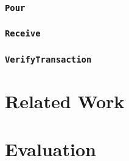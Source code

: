\documentclass{article}
\begin{document}
\subsubsection{\texttt{Pour}}
\subsubsection{\texttt{Receive}}
\subsubsection{\texttt{VerifyTransaction}}

\section{Related Work}
\section{Evaluation}

\newpage
\printbibliography
\end{document}
